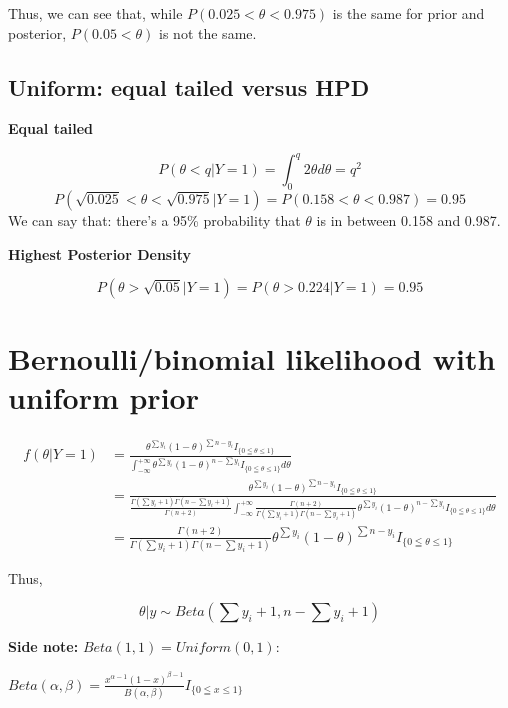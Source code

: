 \documentclass[]{book}
\begin{document}
Thus, we can see that, while \(P(0.025<\theta<0.975)\) is the same for prior and posterior, \(P(0.05<\theta)\) is not the same.

\hypertarget{uniform-equal-tailed-versus-hpd}{%
\subsection{Uniform: equal tailed versus HPD}\label{uniform-equal-tailed-versus-hpd}}

\textbf{Equal tailed}

\[P(\theta < q|Y=1)=\int_0^q 2\theta d\theta=q^2\]
\[P(\sqrt{0.025}<\theta<\sqrt{0.975}|Y=1)=P(0.158<\theta<0.987)=0.95\]
We can say that: there's a 95\% probability that \(\theta\) is in between 0.158 and 0.987.

\textbf{Highest Posterior Density}

\[P(\theta > \sqrt{0.05}|Y=1)=P(\theta >0.224|Y=1)=0.95\]

\hypertarget{bernoullibinomial-likelihood-with-uniform-prior}{%
\section{Bernoulli/binomial likelihood with uniform prior}\label{bernoullibinomial-likelihood-with-uniform-prior}}

\[\begin{aligned}  f(\theta | Y=1) &= \frac{\theta^{\sum y_i}(1-\theta)^{\sum n-y_i} I_{\{0 \leqq \theta \leqslant 1\}}}{\int_{-\infty}^{+\infty} \theta^{\sum y_i}(1-\theta)^{n-\sum y_i} I_{\{0 \leqq \theta \leqslant 1\}} d\theta} \\ &=\frac{\theta^{\sum y_i}(1-\theta)^{\sum n-y_i} I_{\{0 \leqq \theta \leqslant 1\}}}{\frac{\Gamma(\sum y_i+1)\Gamma(n-\sum y_i+1)}{\Gamma(n+2)} \int_{-\infty}^{+\infty} \frac{\Gamma(n+2)}{\Gamma(\sum y_i+1)\Gamma(n-\sum y_i+1)} \theta^{\sum y_i}(1-\theta)^{n-\sum y_i} I_{\{0 \leqq \theta \leqslant 1\}} d\theta} \\ &= \frac{\Gamma(n+2)}{\Gamma(\sum y_i+1)\Gamma(n-\sum y_i+1)}\theta^{\sum y_i}(1-\theta)^{\sum n-y_i} I_{\{0 \leqq \theta \leqslant 1\}}  \end{aligned} \]

Thus,

\[\theta | y \sim Beta (\sum y_i+1, n-\sum y_i +1)\]

\textbf{Side note:}
\(Beta(1,1)=Uniform(0,1)\):

\(Beta(\alpha,\beta)=\frac{x^{\alpha-1}(1-x)^{\beta-1}}{B(\alpha,\beta)} I_{\{0 \leqq x \leqslant 1\}}\)
\end{document}
